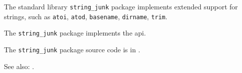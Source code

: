 
The standard library {\tt string\_junk} package implements extended support for strings, such as {\tt atoi}, {\tt atod}, {\tt basename}, {\tt dirname}, {\tt trim}.
 
The {\tt string\_junk} package implements the  api.

The {\tt string\_junk} package source code is in .

See also:  .


